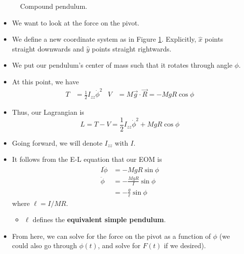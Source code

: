 \documentclass[../notes.tex]{subfiles}
\begin{document}
\begin{itemize}
\begin{figure}[H]
        \caption{Compound pendulum.}
        \label{fig:compoundPendulum}
    \end{figure}
    \begin{itemize}
        \item We want to look at the force on the pivot.
        \item We define a new coordinate system as in Figure \ref{fig:compoundPendulum}. Explicitly, $\hat{x}$ points straight downwards and $\hat{y}$ points straight rightwards.
        \item We put our pendulum's center of mass such that it rotates through angle $\phi$.
        \item At this point, we have
        \begin{align*}
            T &= \frac{1}{2}I_{zz}\dot{\phi}^2&
            V &= M\vec{g}\cdot\vec{R} = -MgR\cos\phi
        \end{align*}
        \item Thus, our Lagrangian is
        \begin{equation*}
            L = T-V = \frac{1}{2}I_{zz}\dot{\phi}^2+MgR\cos\phi
        \end{equation*}
        \item Going forward, we will denote $I_{zz}$ with $I$.
        \item It follows from the E-L equation that our EOM is
        \begin{align*}
            I\ddot{\phi} &= -MgR\sin\phi\\
            \ddot{\phi} &= -\frac{MgR}{I}\sin\phi\\
            &= -\frac{g}{\ell}\sin\phi
        \end{align*}
        where $\ell=I/MR$.
        \begin{itemize}
            \item $\ell$ defines the \textbf{equivalent simple pendulum}.
        \end{itemize}
        \item From here, we can solve for the force on the pivot as a function of $\phi$ (we could also go through $\phi(t)$, and solve for $F(t)$ if we desired).

\end{itemize}
\end{itemize}
\end{document}
